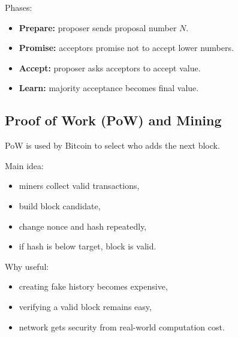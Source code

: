 \documentclass[12pt,a4paper]{article}
\begin{document}
Phases:
\begin{itemize}
\item \textbf{Prepare:} proposer sends proposal number $N$.
\item \textbf{Promise:} acceptors promise not to accept lower numbers.
\item \textbf{Accept:} proposer asks acceptors to accept value.
\item \textbf{Learn:} majority acceptance becomes final value.
\end{itemize}

\begin{center}
\end{center}

\subsection{Proof of Work (PoW) and Mining}
PoW is used by Bitcoin to select who adds the next block.

Main idea:
\begin{itemize}
\item miners collect valid transactions,
\item build block candidate,
\item change nonce and hash repeatedly,
\item if hash is below target, block is valid.
\end{itemize}

Why useful:
\begin{itemize}
\item creating fake history becomes expensive,
\item verifying a valid block remains easy,
\item network gets security from real-world computation cost.
\end{itemize}

\begin{center}
\end{center}
\end{document}
